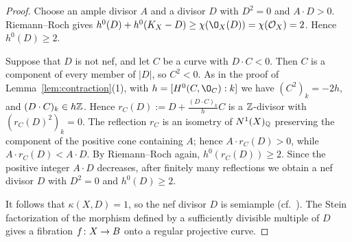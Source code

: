 \begin{proof}
Choose an ample divisor $A$ and a divisor $D$ with $D^2 = 0$ and $A\cdot D>0$.
Riemann--Roch gives $h^0(D)+h^0(K_X-D)\geq\chi(\O_X(D)) = \chi(\mathcal O_X) = 2$.
Hence $h^0(D)\geq 2$.

Suppose that $D$ is not nef, and let $C$ be a curve with $D\cdot C<0$.
Then $C$ is a component of every member of $\lvert D\rvert$, so $C^2<0$.
As in the proof of Lemma~\ref{lem:contraction}(1), with $h = [H^0(C,\O_C):k]$ we have $(C^2)_k = -2h$, and $(D\cdot C)_k\in h\mathbb{Z}$.
Hence $r_C(D) := D+\frac{(D\cdot C)_k}{h}C$ is a $\mathbb{Z}$-divisor with $(r_C(D)^2)_k = 0$.
The reflection $r_C$ is an isometry of $N^1(X)_{\mathbb{Q}}$ preserving the component of the positive cone containing $A$; hence $A\cdot r_C(D)>0$, while $A\cdot r_C(D)<A\cdot D$.
By Riemann--Roch again, $h^0(r_C(D))\geq 2$.
Since the positive integer $A\cdot D$ decreases, after finitely many reflections we obtain a nef divisor $D$ with $D^2 = 0$ and $h^0(D)\geq 2$.

It follows that $\kappa(X,D) = 1$, so the nef divisor $D$ is semiample (cf.\ \cite[Lemma~2.7]{Tan20}).
The Stein factorization of the morphism defined by a sufficiently divisible multiple of $D$ gives a fibration $f\colon X\to B$ onto a regular projective curve.
\end{proof}
